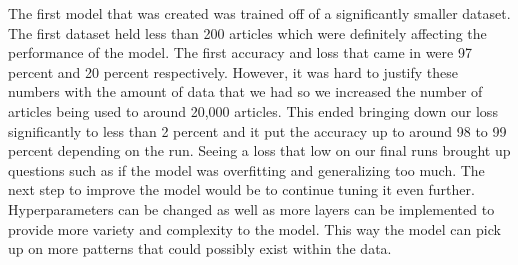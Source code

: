 The first model that was created was trained off of a significantly smaller dataset. The first dataset held less than 200 articles which were definitely affecting the performance of the model. The first accuracy and loss that came in were 97 percent and 20 percent respectively. However, it was hard to justify these numbers with the amount of data that we had so we increased the number of articles being used to around 20,000 articles. This ended bringing down our loss significantly to less than 2 percent and it put the accuracy up to around 98 to 99 percent depending on the run. Seeing a loss that low on our final runs brought up questions such as if the model was overfitting and generalizing too much. The next step to improve the model would be to continue tuning it even further. Hyperparameters can be changed as well as more layers can be implemented to provide more variety and complexity to the model. This way the model can pick up on more patterns that could possibly exist within the data. 